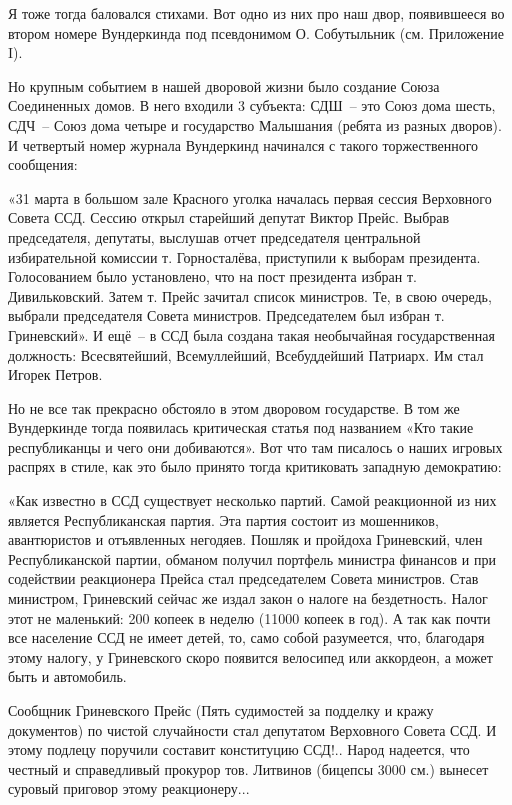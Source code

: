 \indent

Я тоже тогда баловался стихами. Вот одно из них про наш двор, появившееся во втором номере Вундеркинда под псевдонимом О. Собутыльник (см. Приложение I).

Но крупным событием в нашей дворовой жизни было создание Союза Соединенных домов. В него входили 3 субъекта: СДШ~-- это Союз дома шесть, СДЧ~-- Союз дома четыре и государство Малышания (ребята из разных дворов). И четвертый номер журнала Вундеркинд начинался с такого торжественного сообщения:

«31 марта в большом зале Красного уголка началась первая сессия Верховного Совета ССД. Сессию открыл старейший депутат Виктор Прейс. Выбрав председателя, депутаты, выслушав отчет председателя центральной избирательной комиссии т. Горносталёва, приступили к выборам президента. Голосованием было установлено, что на пост президента избран т. Дивильковский. Затем т. Прейс зачитал список министров. Те, в свою очередь, выбрали председателя Совета министров. Председателем был избран т. Гриневский». И ещё~-- в ССД была создана такая необычайная государственная должность: Всесвятейший, Всемуллейший, Всебуддейший Патриарх. Им стал Игорек Петров.

Но не все так прекрасно обстояло в этом дворовом государстве. В том же Вундеркинде тогда появилась критическая статья под названием «Кто такие республиканцы и чего они добиваются». Вот что там писалось о наших игровых распрях в стиле, как это было принято тогда критиковать западную демократию:

«Как известно в ССД существует несколько партий. Самой реакционной из них является Республиканская партия. Эта партия состоит из мошенников, авантюристов и отъявленных негодяев. Пошляк и пройдоха Гриневский, член Республиканской партии, обманом получил портфель министра финансов и при содействии реакционера Прейса стал председателем Совета министров. Став министром, Гриневский сейчас же издал закон о налоге на бездетность. Налог этот не маленький: 200 копеек в неделю (11000 копеек в год). А так как почти все население ССД не имеет детей, то, само собой разумеется, что, благодаря этому налогу, у Гриневского скоро появится велосипед или аккордеон, а может быть и автомобиль.

Сообщник Гриневского Прейс (Пять судимостей за подделку и кражу документов) по чистой случайности стал депутатом Верховного Совета ССД. И этому подлецу поручили составит конституцию ССД!.. Народ надеется, что честный и справедливый прокурор тов. Литвинов (бицепсы 3000 см.) вынесет суровый приговор этому реакционеру...

